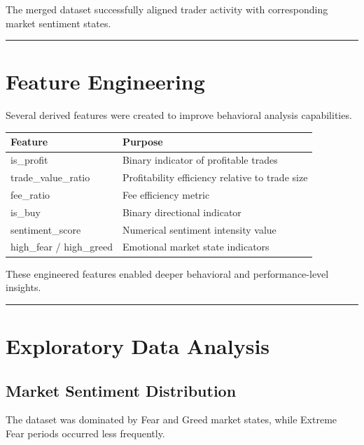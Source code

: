 \documentclass[11pt,a4paper]{article}
\begin{document}
The merged dataset successfully aligned trader activity with corresponding market sentiment states.


\vspace{0.5cm}
\hrule
\vspace{0.3cm}

\section{Feature Engineering}

Several derived features were created to improve behavioral analysis capabilities.

\begin{table}[H]
\centering
\begin{tabular}{|m{4cm}|m{9cm}|}
\hline
\textbf{Feature} & \textbf{Purpose} \\
\hline
is\_profit & Binary indicator of profitable trades \\
\hline
trade\_value\_ratio & Profitability efficiency relative to trade size \\
\hline
fee\_ratio & Fee efficiency metric \\
\hline
is\_buy & Binary directional indicator \\
\hline
sentiment\_score & Numerical sentiment intensity value \\
\hline
high\_fear / high\_greed & Emotional market state indicators \\
\hline
\end{tabular}
\end{table}

These engineered features enabled deeper behavioral and performance-level insights.


\vspace{0.5cm}
\hrule
\vspace{0.3cm}

\section{Exploratory Data Analysis}

\subsection{Market Sentiment Distribution}

The dataset was dominated by Fear and Greed market states, while Extreme Fear periods occurred less frequently.
\end{document}

